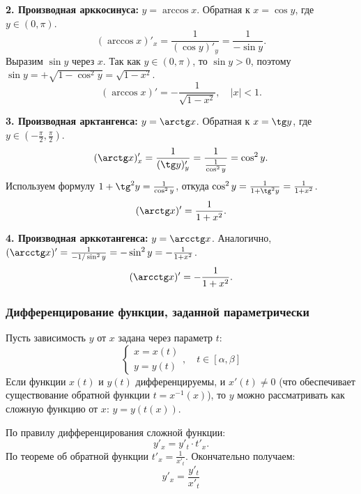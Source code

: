 \textbf{2. Производная арккосинуса:} $y = \arccos x$.
Обратная к $x = \cos y$, где $y \in (0, \pi)$.
\[ (\arccos x)'_x = \frac{1}{(\cos y)'_y} = \frac{1}{-\sin y}. \]
Выразим $\sin y$ через $x$. Так как $y \in (0, \pi)$, то $\sin y > 0$, поэтому $\sin y = +\sqrt{1 - \cos^2 y} = \sqrt{1-x^2}$.
\[ (\arccos x)' = -\frac{1}{\sqrt{1 - x^2}}, \quad |x| < 1. \]

\textbf{3. Производная арктангенса:} $y = \arctg x$.
Обратная к $x = \tg y$, где $y \in (-\frac{\pi}{2}, \frac{\pi}{2})$.
\[ (\arctg x)'_x = \frac{1}{(\tg y)'_y} = \frac{1}{\frac{1}{\cos^2 y}} = \cos^2 y. \]
Используем формулу $1 + \tg^2 y = \frac{1}{\cos^2 y}$, откуда $\cos^2 y = \frac{1}{1 + \tg^2 y} = \frac{1}{1 + x^2}$.
\[ (\arctg x)' = \frac{1}{1 + x^2}. \]

\textbf{4. Производная арккотангенса:} $y = \arcctg x$.
Аналогично, $(\arcctg x)' = \frac{1}{-1/\sin^2 y} = -\sin^2 y = -\frac{1}{1+x^2}$.
\[ (\arcctg x)' = -\frac{1}{1 + x^2}. \]

\subsubsection*{Дифференцирование функции, заданной параметрически}

Пусть зависимость $y$ от $x$ задана через параметр $t$:
\[ \begin{cases} x = x(t) \\ y = y(t) \end{cases}, \quad t \in [\alpha, \beta] \]
Если функции $x(t)$ и $y(t)$ дифференцируемы, и $x'(t) \neq 0$ (что обеспечивает существование обратной функции $t = x^{-1}(x)$), то $y$ можно рассматривать как сложную функцию от $x$: $y = y(t(x))$.

По правилу дифференцирования сложной функции:
\[ y'_x = y'_t \cdot t'_x. \]
По теореме об обратной функции $t'_x = \frac{1}{x'_t}$.
Окончательно получаем:
\[ y'_x = \frac{y'_t}{x'_t} \]
